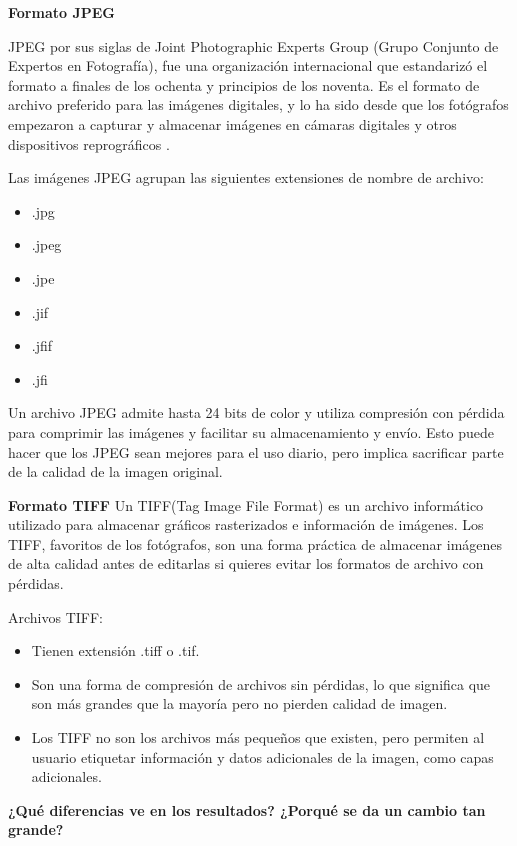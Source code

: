 \documentclass[conference,onecolumn,12pt]{IEEEtran}
\numberwithin{equation}{subsection}
\begin{document}
\textbf{Formato JPEG}

JPEG por sus siglas de Joint Photographic Experts Group (Grupo Conjunto de Expertos en Fotografía), fue una organización internacional que estandarizó el formato a finales de los ochenta y principios de los noventa. Es el formato de archivo preferido para las imágenes digitales, y lo ha sido desde que los fotógrafos empezaron a capturar y almacenar imágenes en cámaras digitales y otros dispositivos reprográficos \cite{balanis}.

Las imágenes JPEG agrupan las siguientes extensiones de nombre de archivo:

\begin{itemize}
\item .jpg
\item .jpeg
\item .jpe
\item .jif
\item .jfif
\item .jfi
\end{itemize}


Un archivo JPEG admite hasta 24 bits de color y utiliza compresión con pérdida para comprimir las imágenes y facilitar su almacenamiento y envío. Esto puede hacer que los JPEG sean mejores para el uso diario, pero implica sacrificar parte de la calidad de la imagen original.


\textbf{Formato TIFF}
Un TIFF(Tag Image File Format) es un archivo informático utilizado para almacenar gráficos rasterizados e información de imágenes. Los TIFF, favoritos de los fotógrafos, son una forma práctica de almacenar imágenes de alta calidad antes de editarlas si quieres evitar los formatos de archivo con pérdidas.

Archivos TIFF:
\begin{itemize}
\item Tienen extensión .tiff o .tif.
\item Son una forma de compresión de archivos sin pérdidas, lo que significa que son más grandes que la mayoría pero no pierden calidad de imagen.
\item Los TIFF no son los archivos más pequeños que existen, pero permiten al usuario etiquetar información y datos adicionales de la imagen, como capas adicionales.
\end{itemize}




\textbf{¿Qué diferencias ve en los resultados? ¿Porqué se da un cambio tan grande?}
\end{document}
